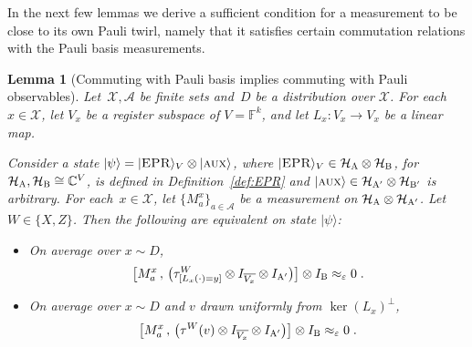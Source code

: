 \documentclass[11pt]{article}
\newtheorem{lemma}[theorem]{Lemma}
\theoremstyle{definition}
\newcommand{\ket}[1]{|#1\rangle}
\newcommand{\Id}{\ensuremath{I}}
\newcommand{\C}{\ensuremath{\mathbb{C}}}
\newcommand{\F}{\ensuremath{\mathbb{F}}}
\newcommand{\mH}{\ensuremath{\mathcal{H}}}
\newcommand{\eps}{\varepsilon}
\newcommand{\labelstyle}[1]{\ensuremath{\textsc{#1}}\xspace}
\newcommand{\EPR}{\labelstyle{EPR}}
\newcommand{\aux}{\labelstyle{aux}}
\newcommand{\alice}{\labelstyle{A}}
\newcommand{\bob}{\labelstyle{B}}
\renewcommand{\cal}[1]{\mathcal{#1}}
\begin{document}
In the next few lemmas we derive a sufficient condition for a measurement to be
close to its own Pauli twirl, namely that it satisfies certain commutation
relations with the Pauli basis measurements.

\begin{lemma}[Commuting with Pauli basis implies commuting with Pauli observables]
  \label{lem:W} 
  Let~$\cal{X},\cal{A}$ be finite sets and~$D$ be a distribution over $\cal{X}$.
  For each~$x \in \cal{X}$, let $V_x$ be a register subspace of $V = \F^k$, and
  let $L_x:V_x \to V_x$ be a linear map.

  Consider a state $\ket{\psi} = \ket{\EPR}_V \otimes \ket{\aux}$, where
  $\ket{\EPR}_{V} \in \mH_\alice \otimes \mH_\bob$, for $\mH_\alice,\mH_\bob
  \cong \C^{V}$, is defined in Definition~\ref{def:EPR} and $\ket{\aux}\in
  \mH_{\alice'} \otimes \mH_{\bob'}$ is arbitrary.
  For each~$x \in \cal{X}$, let $\{M^{x}_a\}_{a \in \cal{A}}$ be a measurement
  on $\mH_{\alice} \otimes \mH_{\alice'}$.
  Let $W\in\{X,Z\}$.
  Then the following are equivalent on state $\ket{\psi}$:
	\begin{itemize}
	\item On average over $x\sim D$, 
    \begin{equation*}
      \big[ M^x_a \,,\, \big(\tau^W_{[L_x(\cdot)=y]} \otimes \Id_{\overline{V_x}}
      \otimes \Id_{\alice'}\big) \big]  \otimes \Id_\bob \approx_\eps 0\;.
    \end{equation*}
  \item On average over $x \sim D$ and $v$ drawn uniformly from $\ker
    (L_x)^\perp$,
    \begin{equation*}
      \big[ M^x_a \,,\, \big( \tau^W(v) \otimes \Id_{\overline{V_x}} \otimes
      \Id_{\alice'} \big) \big]  \otimes \Id_\bob \approx_\eps 0\;.
    \end{equation*}
	\end{itemize}
\end{lemma}
\end{document}
